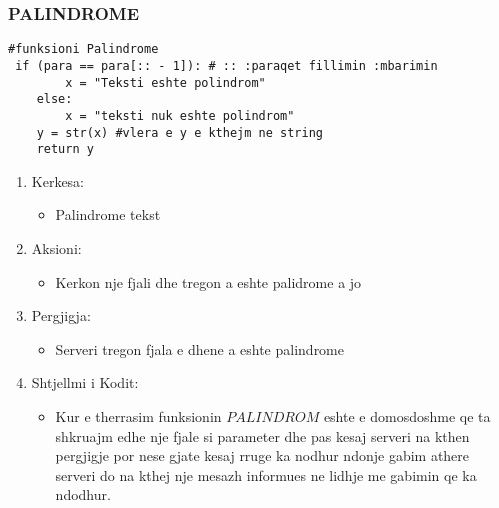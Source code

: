 \documentclass[]{article}
\begin{document}
\subsubsection{PALINDROME}
\begin{lstlisting}
#funksioni Palindrome
 if (para == para[:: - 1]): # :: :paraqet fillimin :mbarimin
        x = "Teksti eshte polindrom"
    else:
        x = "teksti nuk eshte polindrom"
    y = str(x) #vlera e y e kthejm ne string
    return y

\end{lstlisting}
\begin{enumerate}
\item Kerkesa:

\begin{itemize}
\item Palindrome tekst
\end{itemize}
\item Aksioni:
\begin{itemize}
\item Kerkon nje fjali dhe tregon a eshte palidrome a jo 
\end{itemize}
\item Pergjigja:
\begin{itemize}
\item Serveri tregon fjala e dhene a eshte palindrome 
\end{itemize}
\item Shtjellmi i Kodit:
\begin{itemize}
\item Kur e therrasim funksionin $PALINDROM$ eshte e domosdoshme qe ta shkruajm edhe nje fjale si parameter dhe pas kesaj serveri na kthen pergjigje por nese gjate kesaj rruge ka nodhur ndonje gabim athere serveri do na kthej nje mesazh informues ne lidhje me gabimin qe ka ndodhur.
\end{itemize}
\end{enumerate}
\newpage
\end{document}
